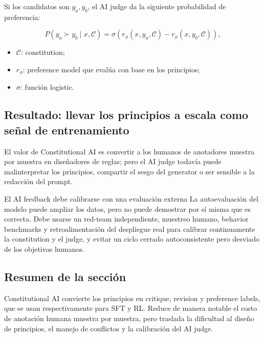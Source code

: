 Si los candidatos son $y_a,y_b$, el AI judge da la siguiente probabilidad de preferencia:

$$
P(y_a\succ y_b\mid x,\mathcal C)
=\sigma\!\left(r_\phi(x,y_a,\mathcal C)-r_\phi(x,y_b,\mathcal C)\right),
$$

\begin{itemize}
    \item $\mathcal C$: constitution;
    \item $r_\phi$: preference model que evalúa con base en los principios;
    \item $\sigma$: función logistic.
\end{itemize}

\subsection{Resultado: llevar los principios a escala como señal de entrenamiento}


El valor de Constitutional AI es convertir a los humanos de anotadores muestra por muestra en diseñadores de reglas; pero el AI judge todavía puede malinterpretar los principios, compartir el sesgo del generator o ser sensible a la redacción del prompt.

\begin{importantbox}{El AI feedback debe calibrarse con una evaluación externa}
La autoevaluación del modelo puede ampliar los datos, pero no puede demostrar por sí misma que es correcta. Debe usarse un red-team independiente, muestreo humano, behavior benchmarks y retroalimentación del despliegue real para calibrar continuamente la constitution y el judge, y evitar un ciclo cerrado autoconsistente pero desviado de los objetivos humanos.
\end{importantbox}

\subsection{Resumen de la sección}

Constitutional AI convierte los principios en critique, revision y preference labels, que se usan respectivamente para SFT y RL. Reduce de manera notable el costo de anotación humana muestra por muestra, pero traslada la dificultad al diseño de principios, el manejo de conflictos y la calibración del AI judge.

